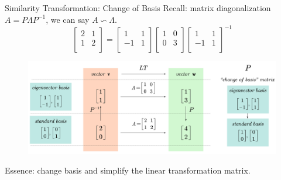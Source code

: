 \documentclass{beamer}
\begin{document}
\begin{frame}{Similarity Transformation: Change of Basis}
Recall: matrix diagonalization $A=P \varLambda P^{-1}$, we can say $A\backsim \varLambda$.
    \begin{equation*}
        \left[ \begin{matrix}
            2&		1\\
            1&		2\\
        \end{matrix} \right] =\left[ \begin{matrix}
            1&		1\\
            -1&		1\\
        \end{matrix} \right] \left[ \begin{matrix}
            1&		0\\
            0&		3\\
        \end{matrix} \right] \left[ \begin{matrix}
            1&		1\\
            -1&		1\\
        \end{matrix} \right] ^{-1}
    \end{equation*}

\begin{figure}
    \centering
    \includegraphics[width=\textwidth]{PNP-1.jpg}
\end{figure}

Essence: change basis and simplify the linear transformation matrix.
\end{frame}
\end{document}
